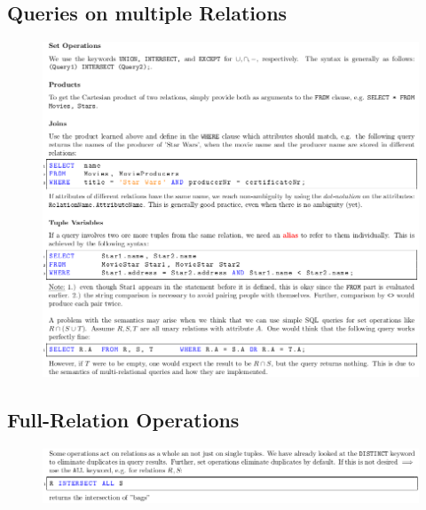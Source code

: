 \documentclass[11pt,oneside,a4paper]{article}
\begin{document}
\subsection{Queries on multiple Relations}

\vspace{-\topsep}
\begin{figure}[hb!]
	\centering
	\includegraphics[width=1\linewidth]{figures/sql_6}
	\label{fig:sql6}
\end{figure}
\vspace{-\topsep}

\subsection{Full-Relation Operations}
\vspace{-\topsep}
\begin{figure}[hb!]
	\centering
	\includegraphics[width=1\linewidth]{figures/sql_7}
	\label{fig:sql7}
\end{figure}
\vspace{-\topsep}

\newpage
\end{document}
